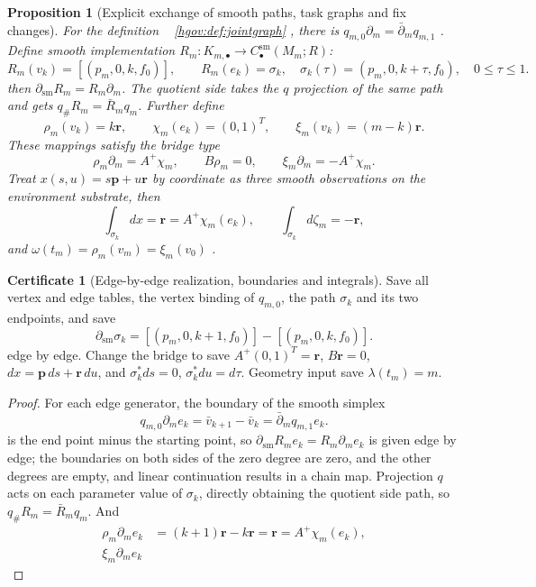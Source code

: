 \documentclass[12pt,a4paper,openany,notitlepage]{report}
\theoremstyle{plain}
\newtheorem{proposition}[theorem]{Proposition}
\theoremstyle{definition}
\newtheorem*{certificate}{Certificate}
\theoremstyle{remark}
\def\mathcal#1{#1}\def\mathsf#1{#1}\def\mathbb#1{#1}%
\begin{document}
\begin{CJK*}
\begin{proposition}
[Explicit exchange of smooth paths, task graphs and fix changes]\label{hgov:prop:jointgraph}
For the definition ~ \ref{hgov:def:jointgraph} , there is $q_{m,0}\partial_m=\bar\partial_mq_{m,1}$ . Define smooth implementation $\mathcal R_m:K_{m,\bullet}\to
C_\bullet^{\mathrm{sm}}(M_m;\mathbb R)$: \[
 \mathcal R_m(v_k)=[(p_m,0,k,f_0)],\qquad
 \mathcal R_m(e_k)=\sigma_k,\quad
 \sigma_k(\tau)=(p_m,0,k+\tau,f_0),\quad 0\le\tau\le1.
\] then $\partial_{\mathrm{sm}}\mathcal R_m=\mathcal R_m\partial_m$. The quotient side takes the $q$ projection of the same path and gets $q_\#\mathcal R_m=\bar{\mathcal R}_mq_m$. Further define \[
 \rho_m(v_k)=k\mathbf r,\qquad
 \chi_m(e_k)=(0,1)^{\mathsf T},\qquad
 \xi_m(v_k)=(m-k)\mathbf r.
\] These mappings satisfy the bridge type \[
 \rho_m\partial_m=A^+\chi_m,\qquad
 B\rho_m=0,\qquad
 \xi_m\partial_m=-A^+\chi_m.
\] Treat $x(s,u)=s\mathbf p+u\mathbf r$ by coordinate as three smooth observations on the environment substrate, then \[
 \int_{\sigma_k}dx=\mathbf r=A^+\chi_m(e_k),\qquad
 \int_{\sigma_k}d\zeta_m=-\mathbf r,
\] and $\omega(t_m)=\rho_m(v_m)=\xi_m(v_0)$ .\end{proposition}
\begin{certificate}
[Edge-by-edge realization, boundaries and integrals]Save all vertex and edge tables, the vertex binding of $q_{m,0}$, the path $\sigma_k$ and its two endpoints, and save \[
 \partial_{\mathrm{sm}}\sigma_k
 =[(p_m,0,k+1,f_0)]-[(p_m,0,k,f_0)].
\] edge by edge. Change the bridge to save $A^+(0,1)^{\mathsf T}=\mathbf r$, $B\mathbf r=0$, $dx=\mathbf p\,ds+\mathbf r\,du$, and $\sigma_k^*ds=0$, $\sigma_k^*du=d\tau$. Geometry input save $\lambda(t_m)=m$.\end{certificate}
\begin{proof}
For each edge generator, the boundary of the smooth simplex \[
 q_{m,0}\partial_me_k
 =\bar v_{k+1}-\bar v_k
 =\bar\partial_mq_{m,1}e_k.
\] is the end point minus the starting point, so $\partial_{\mathrm{sm}}\mathcal R_me_k
=\mathcal R_m\partial_me_k$ is given edge by edge; the boundaries on both sides of the zero degree are zero, and the other degrees are empty, and linear continuation results in a chain map. Projection $q$ acts on each parameter value of $\sigma_k$, directly obtaining the quotient side path, so $q_\#\mathcal R_m=\bar{\mathcal R}_mq_m$. And \[
 \begin{aligned}
 \rho_m\partial_me_k
 &=(k+1)\mathbf r-k\mathbf r
 =\mathbf r=A^+\chi_m(e_k),\\
 \xi_m\partial_me_k

\end{aligned}\]
\end{proof}
\end{CJK*}
\end{document}
